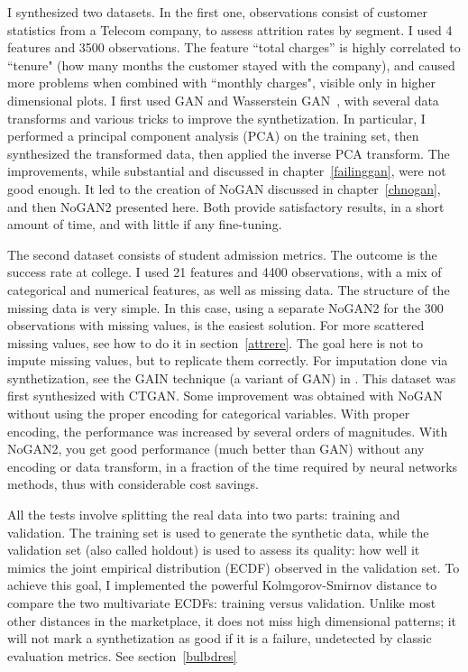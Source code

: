 \documentclass[oneside,10pt]{book}
\begin{document}
I synthesized two datasets. In the first one, observations consist of customer statistics from a Telecom company, to assess attrition rates by segment.
I used 4 features and 3500 observations. The feature ``total charges'' is highly correlated to ``tenure" (how many months the
 customer stayed with the company), and caused more problems when combined with ``monthly charges", visible only in higher dimensional plots. I first used GAN
 and Wasserstein GAN~\cite{ieeewgan}, with several data transforms and various tricks to improve the synthetization. In particular,
 I performed a \textcolor{index}{principal component analysis} (PCA) on the training set, then synthesized the transformed data, then applied the inverse PCA transform. The improvements, while substantial and discussed in chapter~\ref{failinggan}, were not
 good enough. It led to the creation of NoGAN discussed in chapter~\ref{chnogan}, and then NoGAN2 presented here. Both provide satisfactory results, in a short amount of time, and with little if any fine-tuning. 

The second dataset consists of student admission metrics. The outcome is the success rate at college. I used 21 features and 4400 observations, with a mix of categorical and numerical features, as well as missing data. The structure of the missing data is very simple. In this case, using a separate NoGAN2 for the 300 observations with missing values, is the easiest solution. For more scattered missing values, see how to do it in section~\ref{attrere}. 
 The goal here is not to impute missing values, but to replicate them correctly. For \textcolor{index}{imputation} done via synthetization, see the GAIN technique (a variant of GAN) in \cite{impugain}.  This dataset was first synthesized with CTGAN. Some
 improvement was obtained with NoGAN without  using the proper encoding for categorical variables. With proper encoding, the performance was increased by several orders of magnitudes. With NoGAN2, you get good performance (much better than GAN) without any encoding or data transform, in a fraction of the time required by neural networks methods, thus with considerable cost savings. 

All the tests involve splitting the real data into two parts: training and validation. The training set is used to generate the synthetic data, while the \textcolor{index}{validation set} (also called \textcolor{index}{holdout}) is used to assess its quality: how well it mimics the 
\textcolor{index}{joint empirical distribution} (ECDF) observed in the validation set. To achieve this goal, I 
 implemented the powerful \textcolor{index}{Kolmgorov-Smirnov distance} to compare the two multivariate ECDFs: training versus validation. Unlike most other distances in the marketplace, it does not miss high dimensional patterns; it will
 not mark a synthetization as good if it is a failure, undetected by classic evaluation metrics. See section~\ref{bulbdres}
\end{document}
